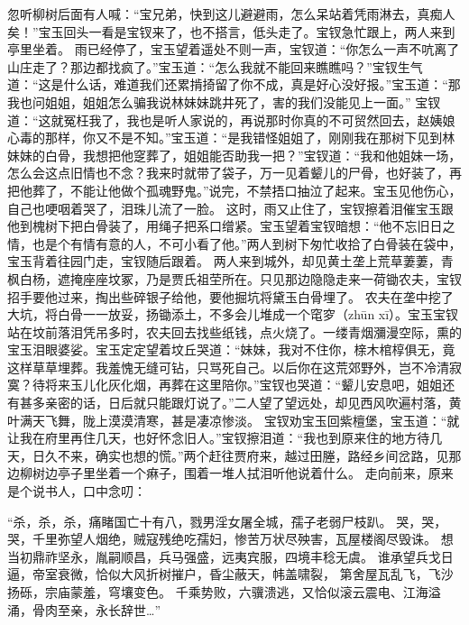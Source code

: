 \documentclass[12pt,oneside]{book}
\begin{document}
忽听柳树后面有人喊：“宝兄弟，快到这儿避避雨，怎么呆站着凭雨淋去，真痴人矣！”宝玉回头一看是宝钗来了，也不搭言，低头走了。宝钗急忙跟上，两人来到亭里坐着。
雨已经停了，宝玉望着遥处不则一声，宝钗道：“你怎么一声不吭离了山庄走了？那边都找疯了。”宝玉道：“怎么我就不能回来瞧瞧吗？”宝钗生气道：“这是什么话，难道我们还累掯掎留了你不成，真是好心没好报。”宝玉道：“那我也问姐姐，姐姐怎么骗我说林妹妹跳井死了，害的我们没能见上一面。”
宝钗道：“这就冤枉我了，我也是听人家说的，再说那时你真的不可贸然回去，赵姨娘心毒的那样，你又不是不知。”宝玉道：“是我错怪姐姐了，刚刚我在那树下见到林妹妹的白骨，我想把他窆葬了，姐姐能否助我一把？”宝钗道：“我和他姐妹一场，怎么会这点旧情也不念？我来时就带了袋子，万一见着颦儿的尸骨，也好装了，再把他葬了，不能让他做个孤魂野鬼。”说完，不禁捂口抽泣了起来。宝玉见他伤心，自己也哽咽着哭了，泪珠儿流了一脸。
这时，雨又止住了，宝钗擦着泪催宝玉跟他到槐树下把白骨装了，用绳子把系口缯紧。宝玉望着宝钗暗想：“他不忘旧日之情，也是个有情有意的人，不可小看了他。”两人到树下匆忙收拾了白骨装在袋中，宝玉背着往园门走，宝钗随后跟着。
两人来到城外，却见黄土垄上荒草萋萋，青枫白杨，遮掩座座坟冢，乃是贾氏祖茔所在。只见那边隐隐走来一荷锄农夫，宝钗招手要他过来，掏出些碎银子给他，要他掘坑将黛玉白骨埋了。
农夫在垄中挖了大坑，将白骨一一放妥，扬锄添土，不多会儿堆成一个窀穸（zhūn xī）。宝玉宝钗站在坟前落泪凭吊多时，农夫回去找些纸钱，点火烧了。一缕青烟瀰漫空际，熏的宝玉泪眼婆娑。宝玉定定望着坟丘哭道：“妹妹，我对不住你，榇木棺椁俱无，竟这样草草埋葬。我羞愧无缝可钻，只骂死自己。以后你在这荒郊野外，岂不冷清寂寞？待将来玉儿化灰化烟，再葬在这里陪你。”宝钗也哭道：“颦儿安息吧，姐姐还有甚多亲密的话，日后就只能跟灯说了。”二人望了望远处，却见西风吹遍村落，黄叶满天飞舞，陇上漠漠清寒，甚是凄凉惨淡。
宝钗劝宝玉回紫檀堡，宝玉道：“就让我在府里再住几天，也好怀念旧人。”宝钗擦泪道：“我也到原来住的地方待几天，日久不来，确实也想的慌。”两个赶往贾府来，越过田塍，路经乡间岔路，见那边柳树边亭子里坐着一个痳子，围着一堆人拭泪听他说着什么。
走向前来，原来是个说书人，口中念叨：

“杀，杀，杀，痛睹国亡十有八，戮男淫女屠全城，孺子老弱尸枝趴。
哭，哭，哭，千里弥望人烟绝，贼寇残绝吃孺妇，惨苦万状尽殃害，瓦屋楼阁尽毁诛。
想当初鼎祚坚永，胤嗣顺昌，兵马强盛，远夷宾服，四境丰稔无虞。
谁承望兵戈日逼，帝室衰微，恰似大风折树摧户，昏尘蔽天，帏盖啸裂，
第舍屋瓦乱飞，飞沙扬砾，宗庙蒙羞，穹壤变色。
千乘势败，六骥溃逃，又恰似滚云震电、江海溢涌，骨肉至亲，永长辞世…”
\end{document}
